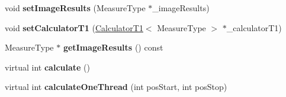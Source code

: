 \begin{DoxyCompactItemize}
\item 
\hypertarget{class_ox_1_1_image_calculator_t1_a57aa44a0e067f5747dc017be41f15d78}{void {\bfseries set\-Image\-Results} (Measure\-Type $\ast$\-\_\-image\-Results)}\label{class_ox_1_1_image_calculator_t1_a57aa44a0e067f5747dc017be41f15d78}

\item 
\hypertarget{class_ox_1_1_image_calculator_t1_a004ea654a123496f4e826714d9b843c8}{void {\bfseries set\-Calculator\-T1} (\hyperlink{class_ox_1_1_calculator_t1}{Calculator\-T1}$<$ Measure\-Type $>$ $\ast$\-\_\-calculator\-T1)}\label{class_ox_1_1_image_calculator_t1_a004ea654a123496f4e826714d9b843c8}

\item 
\hypertarget{class_ox_1_1_image_calculator_t1_ab8670346a47b573558357787b64dc94d}{Measure\-Type $\ast$ {\bfseries get\-Image\-Results} () const }\label{class_ox_1_1_image_calculator_t1_ab8670346a47b573558357787b64dc94d}

\item 
\hypertarget{class_ox_1_1_image_calculator_t1_ad97c2f2b08a7004815445027523f97ed}{virtual int {\bfseries calculate} ()}\label{class_ox_1_1_image_calculator_t1_ad97c2f2b08a7004815445027523f97ed}

\item 
\hypertarget{class_ox_1_1_image_calculator_t1_a3ff9a9627bae210326cfbeebea097cb8}{virtual int {\bfseries calculate\-One\-Thread} (int pos\-Start, int pos\-Stop)}\label{class_ox_1_1_image_calculator_t1_a3ff9a9627bae210326cfbeebea097cb8}

\end{DoxyCompactItemize}
